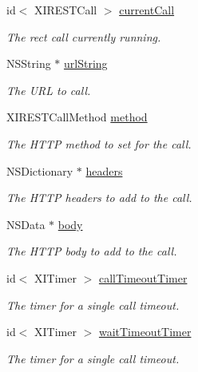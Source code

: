 \begin{DoxyCompactItemize}
id$<$ X\+I\+R\+E\+S\+T\+Call $>$ \hyperlink{category_x_i_robust_r_e_s_t_call_07_08_af87b849dcdb3ead87e53fa2f747ee3ab}{current\+Call}
\begin{DoxyCompactList}\small\item\em The rect call currently running. \end{DoxyCompactList}\item 
N\+S\+String $\ast$ \hyperlink{category_x_i_robust_r_e_s_t_call_07_08_ade598ca3442f11fbf8667b7322ac6bc8}{url\+String}
\begin{DoxyCompactList}\small\item\em The U\+RL to call. \end{DoxyCompactList}\item 
X\+I\+R\+E\+S\+T\+Call\+Method \hyperlink{category_x_i_robust_r_e_s_t_call_07_08_aa1832057faed9fc9e60ff583ec8becf2}{method}
\begin{DoxyCompactList}\small\item\em The H\+T\+TP method to set for the call. \end{DoxyCompactList}\item 
N\+S\+Dictionary $\ast$ \hyperlink{category_x_i_robust_r_e_s_t_call_07_08_ac73826c3921c0612f0ddbfff7667566a}{headers}
\begin{DoxyCompactList}\small\item\em The H\+T\+TP headers to add to the call. \end{DoxyCompactList}\item 
N\+S\+Data $\ast$ \hyperlink{category_x_i_robust_r_e_s_t_call_07_08_a9b04700bffe91efc03700dc8b69b5e2b}{body}
\begin{DoxyCompactList}\small\item\em The H\+T\+TP body to add to the call. \end{DoxyCompactList}\item 
id$<$ X\+I\+Timer $>$ \hyperlink{category_x_i_robust_r_e_s_t_call_07_08_abcd9232ef75177aa6fa882050044f97b}{call\+Timeout\+Timer}
\begin{DoxyCompactList}\small\item\em The timer for a single call timeout. \end{DoxyCompactList}\item 
id$<$ X\+I\+Timer $>$ \hyperlink{category_x_i_robust_r_e_s_t_call_07_08_ac719a5af700e85389765512407704b9c}{wait\+Timeout\+Timer}
\begin{DoxyCompactList}\small\item\em The timer for a single call timeout. \end{DoxyCompactList}\item 

\end{DoxyCompactItemize}

